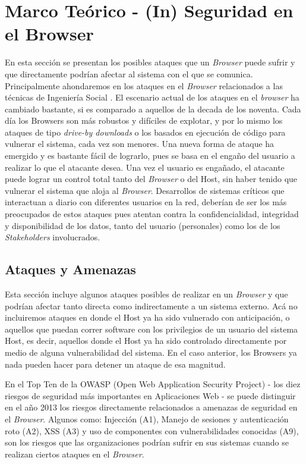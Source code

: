 \chapter{Marco Teórico - (In) Seguridad en el Browser}
\label{chap3:MT}


En esta sección se presentan los posibles ataques que un \textit{Browser} puede sufrir y que directamente podrían afectar al sistema con el que se comunica. Principalmente ahondaremos en los ataques en el \textit{Browser} relacionados a las técnicas de Ingeniería Social \cite{socEngineeering}. El escenario actual de los ataques en el \textit{browser} ha cambiado bastante, si es comparado a aquellos de la decada de los noventa. Cada día los Browsers son más robustos y difíciles de explotar, y por lo mismo los ataques de tipo \textit{drive-by downloads} o los basados en ejecución de código para vulnerar el sistema, cada vez son menores. Una nueva forma de ataque ha emergido y es bastante fácil de lograrlo, pues se basa en el engaño del usuario a realizar lo que el atacante desea. Una vez el usuario es engañado, el atacante puede lograr un control total tanto del \textit{Browser} o del Host, sin haber tenido que vulnerar el sistema \cite{Rajab2013,Labs2013} que aloja al \textit{Browser}. Desarrollos de sistemas críticos que interactuan a diario con diferentes usuarios en la red, deberían de ser los más preocupados de estos ataques pues atentan contra la confidencialidad, integridad y disponibilidad de los datos, tanto del usuario (personales) como los de los \textit{Stakeholders} involucrados.

\section{Ataques y Amenazas}
Esta sección incluye algunos ataques posibles de realizar en un \textit{Browser} y que podrían afectar tanto directa como indirectamente a un sistema externo. Acá no incluiremos ataques en donde el Host ya ha sido vulnerado con anticipación, o aquellos que puedan correr software con los privilegios de un usuario del sistema Host, es decir, aquellos donde el Host ya ha sido controlado directamente por medio de alguna vulnerabilidad del sistema. En el caso anterior, los Browsers ya nada pueden hacer para detener un ataque de esa magnitud.

En el Top Ten \cite{owaspTopTen} de la OWASP (Open Web Application Security Project) - los diez riesgos de seguridad más importantes en Aplicaciones Web - se puede distinguir en el año 2013 los riesgos directamente relacionados a amenazas de seguridad en el \textit{Browser}. Algunos como: Injección (A1), Manejo de sesiones y autenticación roto (A2), XSS (A3) y uso de componentes con vulnerabilidades conocidas (A9), son los riesgos que las organizaciones podrían sufrir en sus sistemas cuando se realizan ciertos ataques en el \textit{Browser}.


